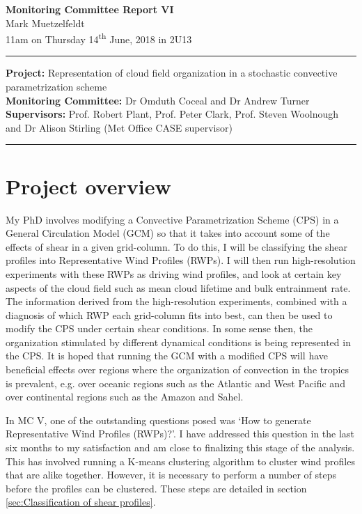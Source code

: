 \documentclass[11pt,a4paper]{article}
\newcommand{\ts}{\textsuperscript}
\begin{document}

\begin{center}
    \Large{\textbf{Monitoring Committee Report VI}}\\[0.1cm]
    \large{Mark Muetzelfeldt}\\
    \normalsize{11am on Thursday 14\ts{th} June, 2018 in 2U13}\\[0.1cm]		
    \rule{\textwidth}{0.2mm}
    \textbf{Project: }Representation of cloud field organization in a stochastic convective parametrization scheme\\
    \textbf{Monitoring Committee: }Dr Omduth Coceal and  Dr Andrew Turner\\
    \textbf{Supervisors: }Prof. Robert Plant, Prof. Peter Clark, Prof. Steven Woolnough \\
    and Dr Alison Stirling (Met Office CASE supervisor)\\
    \rule{\textwidth}{0.2mm}
\end{center}

\section{Project overview}
\label{sec:Project Overview}

My PhD involves modifying a Convective Parametrization Scheme (CPS) in a General Circulation Model (GCM) so that it takes into account some of the effects of shear in a given grid-column. To do this, I will be classifying the shear profiles into Representative Wind Profiles (RWPs). I will then run high-resolution experiments with these RWPs as driving wind profiles, and look at certain key aspects of the cloud field such as mean cloud lifetime and bulk entrainment rate. The information derived from the high-resolution experiments, combined with a diagnosis of which RWP each grid-column fits into best, can then be used to modify the CPS under certain shear conditions. In some sense then, the organization stimulated by different dynamical conditions is being represented in the CPS. It is hoped that running the GCM with a modified CPS will have beneficial effects over regions where the organization of convection in the tropics is prevalent, e.g. over oceanic regions such as the Atlantic and West Pacific and over continental regions such as the Amazon and Sahel.

In MC V, one of the outstanding questions posed was `How to generate Representative Wind Profiles (RWPs)?'. I have addressed this question in the last six months to my satisfaction and am close to finalizing this stage of the analysis. This has involved running a K-means clustering algorithm to cluster wind profiles that are alike together. However, it is necessary to perform a number of steps before the profiles can be clustered. These steps are detailed in section \ref{sec:Classification of shear profiles}.
\end{document}
